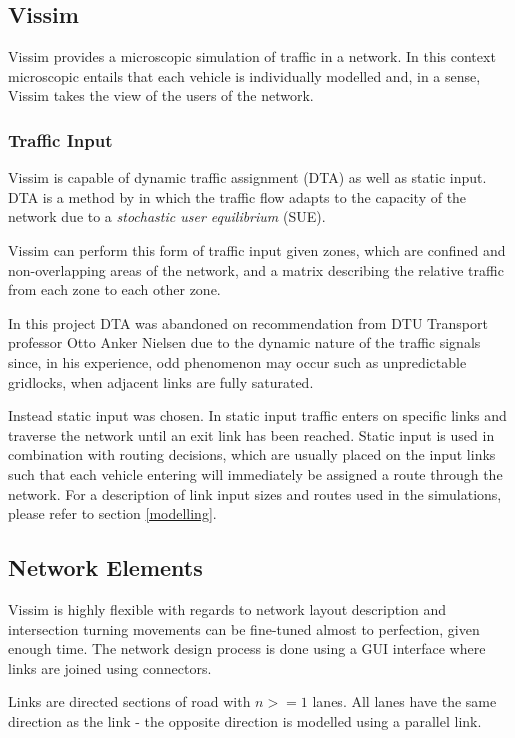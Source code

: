 \subsection{Vissim}
Vissim provides a microscopic simulation of traffic in a network. In this context microscopic entails that each vehicle is individually modelled and, in a sense, Vissim takes the view of the users of the network.

\subsubsection{Traffic Input}
Vissim is capable of dynamic traffic assignment (DTA) as well as static input. DTA is a method by \cite{Wardrop} in which the traffic flow adapts to the capacity of the network due to a \textit{stochastic user equilibrium} (SUE). 

Vissim can perform this form of traffic input given zones, which are confined and non-overlapping areas of the network, and a matrix describing the relative traffic from each zone to each other zone.

In this project DTA was abandoned on recommendation from DTU Transport professor Otto Anker Nielsen due to the dynamic nature of the traffic signals since, in his experience, odd phenomenon may occur such as unpredictable gridlocks, when adjacent links are fully saturated.

Instead static input was chosen. In static input traffic enters on specific links and traverse the network until an exit link has been reached. Static input is used in combination with routing decisions, which are usually placed on the input links such that each vehicle entering will immediately be assigned a route through the network. For a description of link input sizes and routes used in the simulations, please refer to section \ref{modelling}.

\subsection{Network Elements}

Vissim is highly flexible with regards to network layout description and intersection turning movements can be fine-tuned almost to perfection, given enough time. The network design process is done using a GUI interface where links are joined using connectors.

Links are directed sections of road with $n>=1$ lanes. All lanes have the same direction as the link - the opposite direction is modelled using a parallel link.

